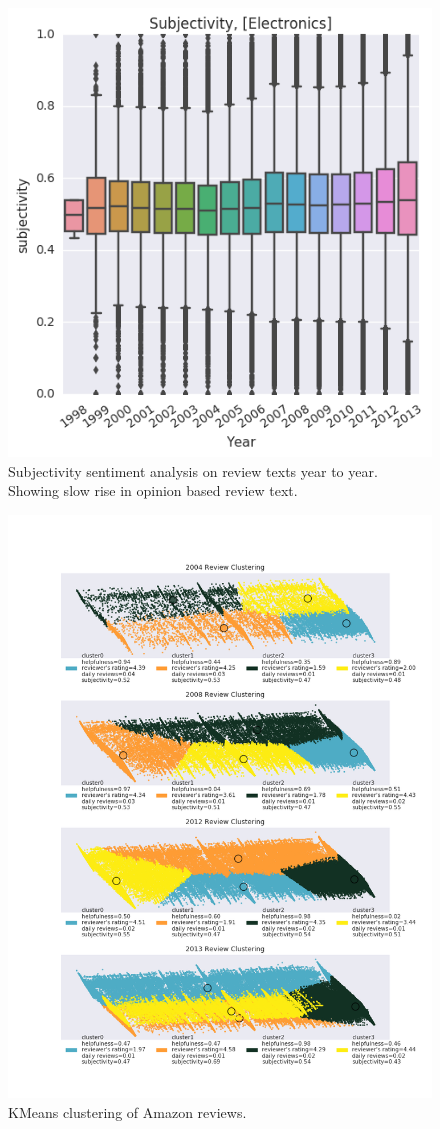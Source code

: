\documentclass[journal, a4paper]{IEEEtran}
\begin{document}
\begin{figure}[!hbt]
    \begin{center}
    \includegraphics[width=\columnwidth]{subjectivity.png}
    \caption{Subjectivity sentiment analysis on review texts year to year. Showing slow rise in opinion based review text.}
    \end{center}
\end{figure}

\begin{figure}
  \centering
    \includegraphics[trim=0 0 0 0,clip,width=.7\textwidth]{clustering.png}
    \caption{KMeans clustering of Amazon reviews.}
\label{fig:overview}
\end{figure}
\end{document}
